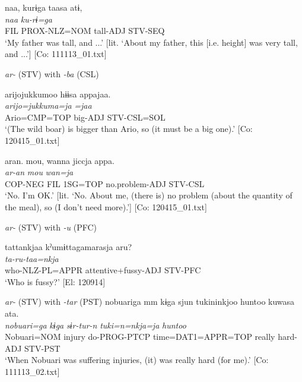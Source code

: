 \ex \label{ex:9.45b} %
    \glll  naa,  kurɨga  taasa  atɨ,\\
      \textit{naa}  \textit{ku-rɨ=ga}  \textit{}  \textit{}\\
      FIL  PROX-NLZ=NOM  tall-ADJ  STV-SEQ\\
      \glt       ‘My father was tall, and ...’ [lit. ‘About my father, this [i.e. height] was very tall, and ...’] [Co: 111113\_01.txt]

\exi{} \textit{ar-} (STV) with \textit{{}-ba} (CSL)

\ex \label{ex:9.45c} %
    \glll  arijojukkumoo  hɨɨsa  appajaa.\\
      \textit{arijo=jukkuma=ja}  \textit{}  \textit{=jaa}\\
      Ario=CMP=TOP  big-ADJ  STV-CSL=SOL\\
      \glt       ‘(The wild boar) is bigger than Ario, so (it must be a big one).’ [Co: 120415\_01.txt]

\ex \label{ex:9.45d} %
 \glll  aran.  {\textbar}mou{\textbar},  wanna  jiccja  appa.\\
      \textit{ar-an}  \textit{mou}  \textit{wan=ja}  \textit{}  \textit{}\\
      COP-NEG  FIL  1SG=TOP  no.problem-ADJ  STV-CSL\\
      \glt       ‘No. I’m OK.’ [lit. ‘No. About me, (there is) no problem (about the quantity of the meal), so (I don’t need more).’] [Co: 120415\_01.txt]

\exi{} \textit{ar-} (STV) with \textit{{}-u} (PFC)

\ex \label{ex:9.45e} %
 \glll  tattankjaa  kˀumɨttagamarasja  aru?\\
      \textit{ta-ru-taa=nkja}  \textit{}  \textit{}\\
      who-NLZ-PL=APPR  attentive+fussy-ADJ  STV-PFC\\
      \glt       ‘Who is fussy?’ [El: 120914]

\exi{}  \textit{ar-} (STV) with \textit{{}-tar} (PST)
\ex
\glll   nobuariga  mm  kɨga  sjun  tukininkjoo  huntoo  kuwasa  ata.\\
      \textit{nobuari=ga}    \textit{kɨga}  \textit{sɨr-tur-n}  \textit{tuki=n=nkja=ja}  \textit{huntoo}  \textit{}  \textit{}\\
      Nobuari=NOM    injury  do-PROG-PTCP  time=DAT1=APPR=TOP  really  hard-ADJ  STV-PST\\
      \glt       ‘When Nobuari was suffering injuries, (it) was really hard (for me).’ [Co: 111113\_02.txt]

